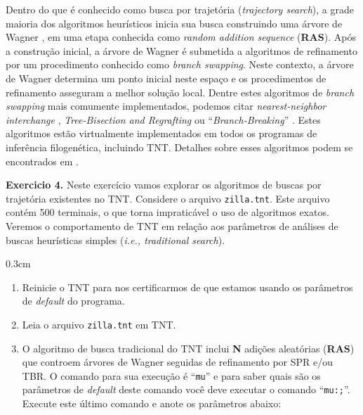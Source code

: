\begin{refsection}
Dentro do que é conhecido como  busca por trajetória (\textit{trajectory search}), a grade maioria dos algoritmos heurísticos inicia sua busca construindo uma árvore de Wagner \parencite{Wagner_1961}, em uma etapa conhecida como \textit{random addition sequence} (\textbf{RAS}). Após a construção inicial, a árvore de Wagner é submetida a algoritmos de refinamento por um procedimento conhecido como \textit{branch swapping}. Neste contexto, a árvore de Wagner determina um ponto inicial neste espaço e os procedimentos de refinamento asseguram a melhor solução local. Dentre estes algoritmos de \textit{branch swapping} mais comumente implementados, podemos citar \textit{nearest-neighbor interchange} \parencite[\textbf{NNI}, ][]{Camin_and_Sokal_1965, Robinson_1971}, \textit{Tree-Bisection and Regrafting} \parencite[TBR, ][]{Swofford_1990} ou ``\textit{Branch-Breaking}'' \parencite[][]{Farris_1988}. Estes algoritmos estão virtualmente implementados em todos os programas de inferência filogenética, incluindo TNT. Detalhes sobre esses algoritmos podem se encontrados em \parencite{SwoffordEtAl1996, Page_and_Homes_1998, Schuh_2000, Felsenstein_2004, Giribet_2007}.

\begin{blackBlock}{\textbf{Exercicio 4.}}\label{tut4:ex:4.8}
	Neste exercício vamos explorar os algoritmos de buscas por trajetória  existentes no TNT. Considere o arquivo \texttt{zilla.tnt}. Este arquivo contém 500 terminais, o que torna impraticável o uso de algoritmos exatos. Veremos o comportamento de TNT em relação aos parâmetros de análises de buscas heurísticas simples (\textit{i.e., traditional search}). 

	\begin {myindentpar}{0.3cm}
	\begin{enumerate}[\itshape i.]
		\item{Reinicie o TNT para nos certificarmos de que estamos usando os parâmetros de \textit{default} do programa.}
		\item{Leia o arquivo \texttt{zilla.tnt} em TNT}.
		\item{O algoritmo de busca tradicional do TNT inclui \textbf{N} adições aleatórias (\textbf{RAS}) que controem árvores de Wagner seguidas de refinamento por SPR e/ou TBR. O comando para sua execução é ``\texttt{mu}'' e para saber quais são os parâmetros de \textit{default} deste comando você deve executar o comando ``\texttt{mu:;}''}. Execute este último comando e anote os parâmetros abaixo:\\


\end{enumerate}
\end{myindentpar}
\end{blackBlock}
\end{refsection}

